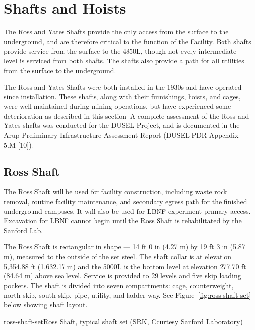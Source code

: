 \section{Shafts and Hoists}
\label{sec:fscf-und-shafts}

The Ross and Yates Shafts provide the only access from the surface to the underground, and are therefore critical to the function of the Facility. Both shafts provide service from the surface to the 4850L, though not every intermediate level is serviced from both shafts. The shafts also provide a path for all utilities from the surface to the underground. 

The Ross and Yates Shafts were both installed in the 1930s and have operated since installation. These shafts, along with their furnishings, hoists, and cages, were well maintained during mining operations, but have experienced some deterioration as described in this section. A complete assessment of the Ross and Yates shafts was conducted for the DUSEL Project, and is documented in the Arup Preliminary Infrastructure Assessment Report (DUSEL PDR Appendix 5.M [10]).



\subsection{Ross Shaft}
\label{sec:fscf-und-shafts-ross}

The Ross Shaft will be used for facility construction, including waste rock removal, routine facility maintenance, and secondary egress path for the finished underground campuses. It will also be used for LBNF experiment primary access. Excavation for LBNF cannot begin until the Ross Shaft is rehabilitated by the Sanford Lab.

The Ross Shaft is rectangular in shape --- 14 ft 0 in (4.27 m) by 19 ft 3 in (5.87 m), measured to the outside of the set steel. The shaft collar is at elevation 5,354.88 ft (1,632.17 m) and the 5000L is the bottom level at elevation 277.70 ft (84.64 m) above sea level. Service is provided to 29 levels and five skip loading pockets. The shaft is divided into seven compartments: cage, counterweight, north skip, south skip, pipe, utility, and ladder way. See Figure~\ref{fig:ross-shaft-set} below showing shaft layout.


\begin{cdrfigure}{ross-shaft-set}{Ross Shaft, typical shaft set (SRK, Courtesy Sanford Laboratory)}
\end{cdrfigure}


